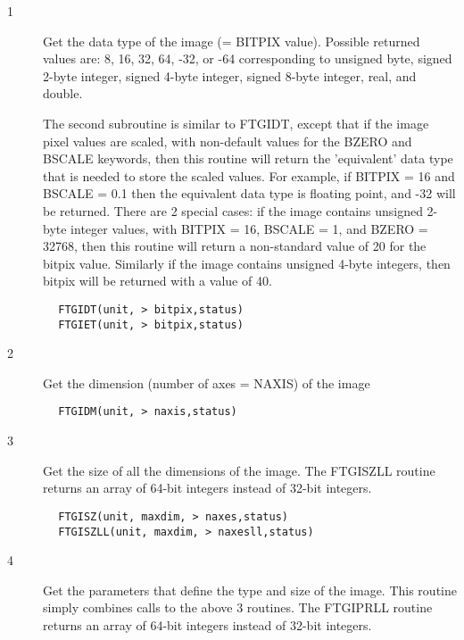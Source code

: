 \documentclass[11pt]{book}
\begin{document}
\begin{description}
\item[1 ] Get the data type of the image (= BITPIX value).  Possible returned
    values are: 8, 16, 32, 64, -32, or -64 corresponding to unsigned byte,
    signed 2-byte integer, signed 4-byte integer, signed 8-byte integer,
    real, and double.

    The second subroutine is similar to FTGIDT, except that if the image
    pixel values are scaled, with non-default values for the BZERO and
    BSCALE keywords, then this routine will return the 'equivalent'
    data type that is needed to store the scaled values.  For example,
    if BITPIX = 16 and BSCALE = 0.1 then the equivalent data type is
    floating point, and -32 will be returned.  There are 2 special cases:
    if the image contains unsigned 2-byte integer values, with BITPIX =
    16, BSCALE = 1, and BZERO = 32768, then this routine will return
    a non-standard value of 20 for the bitpix value.  Similarly if the
    image contains unsigned 4-byte integers, then bitpix will
   be returned with a value of 40.
\end{description}


\begin{verbatim}
        FTGIDT(unit, > bitpix,status)
        FTGIET(unit, > bitpix,status)
\end{verbatim}

\begin{description}
\item[2 ] Get the dimension (number of axes = NAXIS) of the image
\end{description}

\begin{verbatim}
        FTGIDM(unit, > naxis,status)
\end{verbatim}

\begin{description}
\item[3 ]  Get the size of all the dimensions of the image. The FTGISZLL
    routine returns an array of 64-bit integers instead of 32-bit integers.
\end{description}

\begin{verbatim}
        FTGISZ(unit, maxdim, > naxes,status)
        FTGISZLL(unit, maxdim, > naxesll,status)
\end{verbatim}

\begin{description}
\item[4 ]  Get the parameters that define the type and size of the image.  This
     routine simply combines calls to the above 3 routines. The FTGIPRLL
    routine returns an array of 64-bit integers instead of 32-bit integers.
\end{description}
\end{document}
